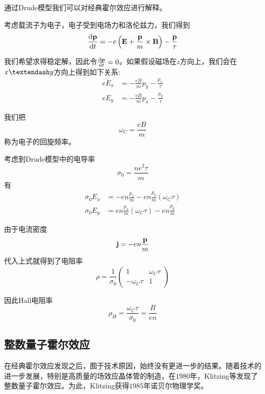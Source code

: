 通过Drude模型我们可以对经典霍尔效应进行解释。

考虑载流子为电子，电子受到电场力和洛伦兹力，我们得到
\begin{equation}
    \dv{\vb p}{t}=-e\left(\vb E+\frac{\vb p}{m}\times\vb B\right)-\frac{\vb p}{\tau}
\end{equation}

我们希望求得稳定解，因此令$\dv{\vb p}{t}=0$。如果假设磁场在$z$方向上，我们会在$x\textendash y$方向上得到如下关系:
\begin{align*}
    eE_x & = -\frac{eB}{m}p_y-\frac{p_x}{\tau} \\
    eE_y & = -\frac{eB}{m}p_x-\frac{p_y}{\tau}
\end{align*}

我们把
\begin{equation}
    \omega_C=\frac{eB}{m}
\end{equation}
称为电子的回旋频率。

考虑到Drude模型中的电导率
\begin{equation}
    \sigma_0=\frac{ne^2\tau}{m}
\end{equation}
有
\begin{align*}
    \sigma_0 E_x & = -en\frac{p_x}{m}-en\frac{p_y}{m}(\omega_C\tau) \\
    \sigma_0 E_y & = en\frac{p_x}{m}(\omega_C\tau)-en\frac{p_y}{m}
\end{align*}

由于电流密度
\begin{equation}
    \vb j=-en\frac{\vb p}{m}
\end{equation}
代入上式就得到了电阻率
\begin{equation}
    \rho=\frac{1}{\sigma_0}\begin{pmatrix}
        1             & \omega_C\tau \\
        -\omega_C\tau & 1
    \end{pmatrix}
\end{equation}

因此Hall电阻率
\begin{equation}
    \rho_H=\frac{\omega_C\tau}{\sigma_0}=\frac{B}{en}
\end{equation}

\subsection{整数量子霍尔效应}

在经典霍尔效应发现之后，囿于技术原因，始终没有更进一步的结果。随着技术的进一步发展，特别是高质量的场效应晶体管的制造，在$1980$年，Klitzing等发现了整数量子霍尔效应\cite{Klitzing1980}。为此，Klitzing获得$1985$年诺贝尔物理学奖。

